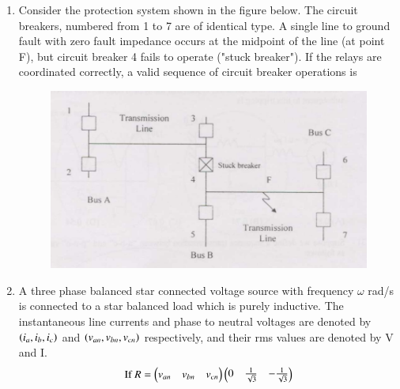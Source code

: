 \documentclass[journal]{IEEEtran}
\begin{document}
\begin{enumerate}
\begin{enumerate}
\end{enumerate}
\bigskip
\item Consider the protection system shown in the figure below. The circuit breakers, numbered from 1 to 7 are of identical type. A single line to ground fault with zero fault impedance occurs at the midpoint of the line (at point F), but circuit breaker 4 fails to operate ("stuck breaker"). If the relays are coordinated correctly, a valid sequence of circuit breaker operations is
\begin{figure}[H]
   \centering
   \includegraphics[width=0.7\linewidth]{figs/fig_6.png}
   \label{stemplot}
\end{figure}
\begin{enumerate}
\end{enumerate}
\bigskip
\item A three phase balanced star connected voltage source with frequency $\omega$ rad/s is connected to a star balanced load which is purely inductive. The instantaneous line currents and phase to neutral voltages are denoted by $\left(i_a,i_b,i_c\right)$ and $\left(v_{an},v_{bn},v_{cn}\right)$ respectively, and their rms values are denoted by V and I.
\begin{align*}
    \text{If }R=\begin{pmatrix}v_{an}&v_{bn}&v_{cn}\end{pmatrix}\begin{pmatrix}0&\frac{1}{\sqrt{3}}&-\frac{1}{\sqrt{3}}\\
\end{pmatrix}
\end{align*}
\end{enumerate}
\end{document}
